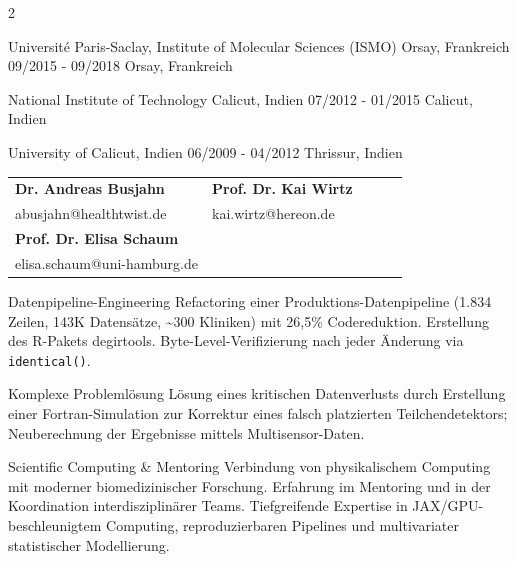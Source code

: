\documentclass{thejus_cv}
\begin{document}
\begin{paracol}{2}

             {Universit\'e Paris-Saclay, Institute of Molecular Sciences (ISMO) Orsay, Frankreich}
             {09/2015 - 09/2018}
             {Orsay, Frankreich}
             {}

             {National Institute of Technology Calicut, Indien}
             {07/2012 - 01/2015}
             {Calicut, Indien}
             {}

             {University of Calicut, Indien}
             {06/2009 - 04/2012}
             {Thrissur, Indien}
             {}


\begin{tabular}{@{}p{0.5\linewidth} p{0.5\linewidth}@{}}
\textbf{Dr. Andreas Busjahn} & \textbf{Prof. Dr. Kai Wirtz} \\
abusjahn@healthtwist.de & kai.wirtz@hereon.de \\[0.4cm]
\textbf{Prof. Dr. Elisa Schaum} & \\
elisa.schaum@uni-hamburg.de & \\
\end{tabular}
\vspace{0.4cm}

\switchcolumn



\cvstrength{\faStar}
           {Datenpipeline-Engineering}
           {Refactoring einer Produktions-Datenpipeline (1.834 Zeilen, 143K Datens\"atze, \textasciitilde300 Kliniken) mit 26,5\% Codereduktion. Erstellung des R-Pakets degirtools. Byte-Level-Verifizierung nach jeder \"Anderung via \texttt{identical()}.}

\cvstrength{\faLightbulb}
           {Komplexe Probleml\"osung}
           {L\"osung eines kritischen Datenverlusts durch Erstellung einer Fortran-Simulation zur Korrektur eines falsch platzierten Teilchendetektors; Neuberechnung der Ergebnisse mittels Multisensor-Daten.}

\cvstrength{\faAward}
           {Scientific Computing \& Mentoring}
           {Verbindung von physikalischem Computing mit moderner biomedizinischer Forschung. Erfahrung im Mentoring und in der Koordination interdisziplin\"arer Teams. Tiefgreifende Expertise in JAX/GPU-beschleunigtem Computing, reproduzierbaren Pipelines und multivariater statistischer Modellierung.}


\end{paracol}
\end{document}

